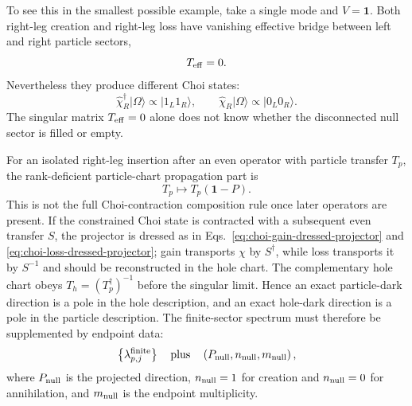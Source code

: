 \documentclass[aps,prb,onecolumn,nofootinbib,superscriptaddress]{revtex4-2}
\newcommand{\I}{\mathbf{1}}
\newcommand{\ket}[1]{\lvert #1\rangle}
\theoremstyle{plain}
\theoremstyle{definition}
\begin{document}
To see this in the smallest possible example, take a single mode and \(V=\I\).
Both right-leg creation and right-leg loss have vanishing effective bridge
between left and right particle sectors,
\begin{equation}
  T_{\rm eff}=0 .
  \label{eq:single-mode-Teff-zero}
\end{equation}
Nevertheless they produce different Choi states:
\begin{equation}
  \hat\chi_R^\dagger\ket{\Omega}\propto\ket{1_L1_R},
  \qquad
  \hat\chi_R\ket{\Omega}\propto\ket{0_L0_R}.
  \label{eq:single-mode-odd-completions}
\end{equation}
The singular matrix \(T_{\rm eff}=0\) alone does not know whether the
disconnected null sector is filled or empty.

For an isolated right-leg insertion after an even operator with particle
transfer \(T_p\), the rank-deficient particle-chart propagation part is
\begin{equation}
  T_p \longmapsto T_p(\I-P).
  \label{eq:right-gain-loss-column-removal}
\end{equation}
This is not the full Choi-contraction composition rule once later operators
are present.  If the constrained Choi state is contracted with a subsequent
even transfer \(S\), the projector is dressed as in
Eqs.~\eqref{eq:choi-gain-dressed-projector} and
\eqref{eq:choi-loss-dressed-projector}; gain transports
\(\chi\) by \(S^\dagger\), while loss transports it by \(S^{-1}\) and should
be reconstructed in the hole chart.
The complementary hole chart obeys \(T_h=(T_p^\dagger)^{-1}\) before the
singular limit.  Hence an exact particle-dark direction is a pole in the hole
description, and an exact hole-dark direction is a pole in the particle
description.  The finite-sector spectrum must therefore be supplemented by
endpoint data:
\begin{equation}
  \left\{\lambda_{p,j}^{\rm finite}\right\}
  \quad {\rm plus}\quad
  \left(P_{\rm null},n_{\rm null},m_{\rm null}\right),
  \label{eq:complete-singular-data}
\end{equation}
where \(P_{\rm null}\) is the projected direction, \(n_{\rm null}=1\) for
creation and \(n_{\rm null}=0\) for annihilation, and \(m_{\rm null}\) is the
endpoint multiplicity.
\end{document}
